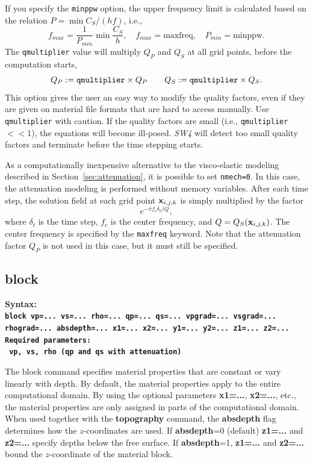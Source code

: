 \documentclass[11pt]{report}
\newcommand{\xb}{{\bf x}}
\begin{document}
If you specify the \verb+minppw+ option, the upper frequency limit is calculated based on the
relation $P=\min C_S/(h f)$, i.e.,
\[
f_{max} = \frac{1}{P_{min}}\min \frac{C_S}{h},\quad f_{max} = \mbox{maxfreq},\quad P_{min}=\mbox{minppw}.
\]
The {\tt qmultiplier} value will multiply $Q_P$ and $Q_S$ at all grid points, before the computation starts,
\[
 Q_P := {\tt qmultiplier} \times Q_P\qquad Q_S := {\tt qmultiplier} \times Q_S.
\] 
This option gives the user an easy way to modify the quality factors, even if they are given on
material file formats that are hard to access manually. Use {\tt qmultiplier} with caution. If the
quality factors are small (i.e., {\tt qmultiplier}$<<1$), the equations will become
ill-posed. \emph{SW4} will detect too small quality factors and terminate before the time stepping
starts.

As a computationally inexpensive alternative to the visco-elastic modeling described in
Section~\ref{sec:attenuation}, it is possible to set \verb+nmech=0+. In this case, the attenuation
modeling is performed without memory variables. After each time step, the solution field at each
grid point $\xb_{i,j,k}$ is simply multiplied by the factor
\[
e^{-\pi f_c \delta_t/Q},
\]
where $\delta_t$ is the time step, $f_c$ is the center frequency, and $Q=Q_S(\xb_{i,j,k})$. The
center frequency is specified by the \verb+maxfreq+ keyword. Note that the attenuation factor $Q_P$
is not used in this case, but it must still be specified.


\subsection{block}
\label{keyword:block}
\begin{flushleft}\bf
Syntax:\\
\tt block
vp=... vs=... rho=... qp=... qs=... vpgrad=... vsgrad=... rhograd=... absdepth=... x1=... x2=... y1=... y2=... z1=... z2=...\\
\bf
Required parameters:\\
\tt
vp, vs, rho  (qp and qs with attenuation)
\end{flushleft}
%
The block command specifies material properties that are constant or vary linearly with depth. By
default, the material properties apply to the entire computational domain. By using the optional
parameters {\bf x1=...}, {\bf x2=...}, etc., the material properties are only assigned in parts of
the computational domain. When used together with the {\bf topography} command, the {\bf absdepth}
flag determines how the $z$-coordinates are used. If {\bf absdepth}=0 (default) {\bf z1=...} and
{\bf z2=...} specify depths below the free surface. If {\bf absdepth}=1,  {\bf z1=...} and
{\bf z2=...} bound the $z$-coordinate of the material block.
\end{document}
